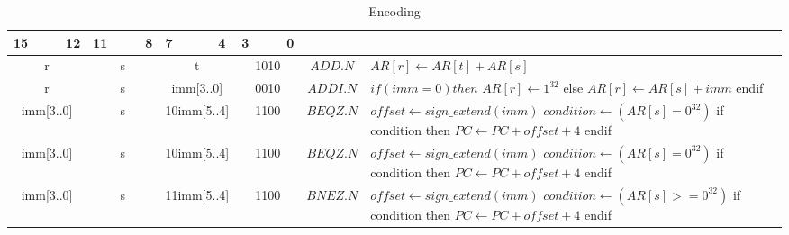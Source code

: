 \setlength{\tabcolsep}{4pt}
\renewcommand{\arraystretch}{2}

\begin{longtable}{llllllllllllllll  p{1cm}  p{7cm} | }
		\caption{Encoding\label{long}}\\
		15 & & & 12 & 11 & & & 8 & 7 & & & 4 & 3 & & & 0 & & \multicolumn{1}{c}{}\\
		\hline
        \endhead
		\multicolumn{4}{|c|}{r} & \multicolumn{4}{c|}{s} & \multicolumn{4}{c|}{t} & \multicolumn{4}{c|}{1010} & \multicolumn{1}{c|}{$ADD.N$} & $AR[r] \leftarrow AR[t] + AR[s]$ \\ \hline
		\multicolumn{4}{|c|}{r} & \multicolumn{4}{c|}{s} & \multicolumn{4}{c|}{imm[3..0]} & \multicolumn{4}{c|}{0010} & \multicolumn{1}{c|}{$ADDI.N$} & $if (imm = 0) then$ \newline $AR[r] \leftarrow 1^{32}$ \newline else \newline $AR[r] \leftarrow AR[s] + imm$ \newline endif \\ \hline
		\multicolumn{4}{|c|}{imm[3..0]} & \multicolumn{4}{c|}{s} & \multicolumn{4}{c|}{10imm[5..4]} & \multicolumn{4}{c|}{1100} & \multicolumn{1}{c|}{$BEQZ.N$} & $offset \leftarrow sign\_extend(imm)$ \newline $condition \leftarrow (AR[s] = 0^{32})$ \newline if condition then \newline $PC \leftarrow PC + offset + 4$ \newline endif \\ \hline
		\multicolumn{4}{|c|}{imm[3..0]} & \multicolumn{4}{c|}{s} & \multicolumn{4}{c|}{10imm[5..4]} & \multicolumn{4}{c|}{1100} & \multicolumn{1}{c|}{$BEQZ.N$} & $offset \leftarrow sign\_extend(imm)$ \newline $condition \leftarrow (AR[s] = 0^{32})$ \newline if condition then \newline $PC \leftarrow PC + offset + 4$ \newline endif \\ \hline
		\multicolumn{4}{|c|}{imm[3..0]} & \multicolumn{4}{c|}{s} & \multicolumn{4}{c|}{11imm[5..4]} & \multicolumn{4}{c|}{1100} & \multicolumn{1}{c|}{$BNEZ.N$} & $offset \leftarrow sign\_extend(imm)$ \newline $condition \leftarrow (AR[s] >= 0^{32})$ \newline if condition then \newline $PC \leftarrow PC + offset + 4$ \newline endif \\ \hline

\end{longtable}
